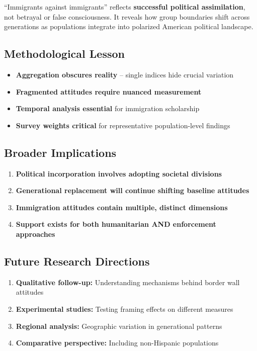 \documentclass[11pt,letterpaper]{article}
\begin{document}
``Immigrants against immigrants'' reflects \textbf{successful political assimilation}, not betrayal or false consciousness. It reveals how group boundaries shift across generations as populations integrate into polarized American political landscape.

\subsection{Methodological Lesson}
\begin{itemize}
    \item \textbf{Aggregation obscures reality} -- single indices hide crucial variation
    \item \textbf{Fragmented attitudes require nuanced measurement}
    \item \textbf{Temporal analysis essential} for immigration scholarship
    \item \textbf{Survey weights critical} for representative population-level findings
\end{itemize}

\subsection{Broader Implications}
\begin{enumerate}
    \item \textbf{Political incorporation involves adopting societal divisions}
    \item \textbf{Generational replacement will continue shifting baseline attitudes}
    \item \textbf{Immigration attitudes contain multiple, distinct dimensions}
    \item \textbf{Support exists for both humanitarian AND enforcement approaches}
\end{enumerate}

\subsection{Future Research Directions}
\begin{enumerate}
    \item \textbf{Qualitative follow-up:} Understanding mechanisms behind border wall attitudes
    \item \textbf{Experimental studies:} Testing framing effects on different measures
    \item \textbf{Regional analysis:} Geographic variation in generational patterns
    \item \textbf{Comparative perspective:} Including non-Hispanic populations
\end{enumerate}
\end{document}
